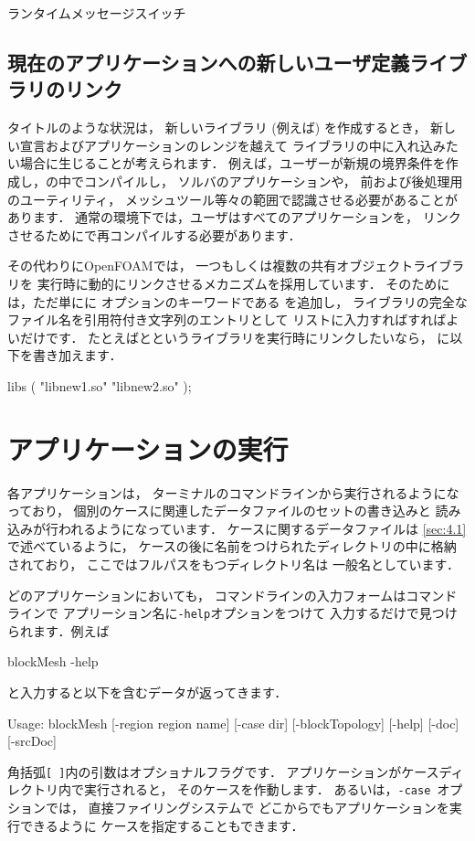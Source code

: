 \begin{table}[ht]
 
 \caption{ランタイムメッセージスイッチ}
 \label{tbl:3.3}
\end{table}


\subsection{現在のアプリケーションへの新しいユーザ定義ライブラリのリンク}
\label{ssec:3.2.6}
タイトルのような状況は，
新しいライブラリ (例えば) を作成するとき，
新しい宣言およびアプリケーションのレンジを越えて
ライブラリの中に入れ込みたい場合に生じることが考えられます．
例えば，ユーザーが新規の境界条件を作成し，の中でコンパイルし，
ソルバのアプリケーションや，
前および後処理用のユーティリティ，
メッシュツール等々の範囲で認識させる必要があることがあります．
通常の環境下では，ユーザはすべてのアプリケーションを，
リンクさせるためにで再コンパイルする必要があります．

その代わりにOpenFOAMでは，
一つもしくは複数の共有オブジェクトライブラリを
実行時に動的にリンクさせるメカニズムを採用しています．
そのためには，ただ単にに
オプションのキーワードである
%
%
を追加し，
ライブラリの完全なファイル名を引用符付き文字列のエントリとして
リストに入力すればすればよいだけです．
たとえばとというライブラリを実行時にリンクしたいなら，
に以下を書き加えます．
\begin{OFverbatim}[file]
libs
(
    "libnew1.so"
    "libnew2.so"
);
\end{OFverbatim}



\section{アプリケーションの実行}
\label{sec:3.3}
各アプリケーションは，
ターミナルのコマンドラインから実行されるようになっており，
個別のケースに関連したデータファイルのセットの書き込みと
読み込みが行われるようになっています．
ケースに関するデータファイルは
\autoref{sec:4.1}で述べているように，
ケースの後に名前をつけられたディレクトリの中に格納されており，
ここではフルパスをもつディレクトリ名は
一般名としています．

どのアプリケーションにおいても，
コマンドラインの入力フォームはコマンドラインで
アプリーション名に\verb|-help|オプションをつけて
入力するだけで見つけられます．例えば
\begin{OFverbatim}[terminal]
blockMesh -help
\end{OFverbatim}
と入力すると以下を含むデータが返ってきます．
\begin{OFverbatim}[terminal]
Usage: blockMesh [-region region name] [-case dir] [-blockTopology]
    [-help] [-doc] [-srcDoc]
\end{OFverbatim}
角括弧\texttt{[ ]}内の引数はオプショナルフラグです．
アプリケーションがケースディレクトリ内で実行されると，
そのケースを作動します．
あるいは，\texttt{-case}~オプションでは，
直接ファイリングシステムで
どこからでもアプリケーションを実行できるように
ケースを指定することもできます．

